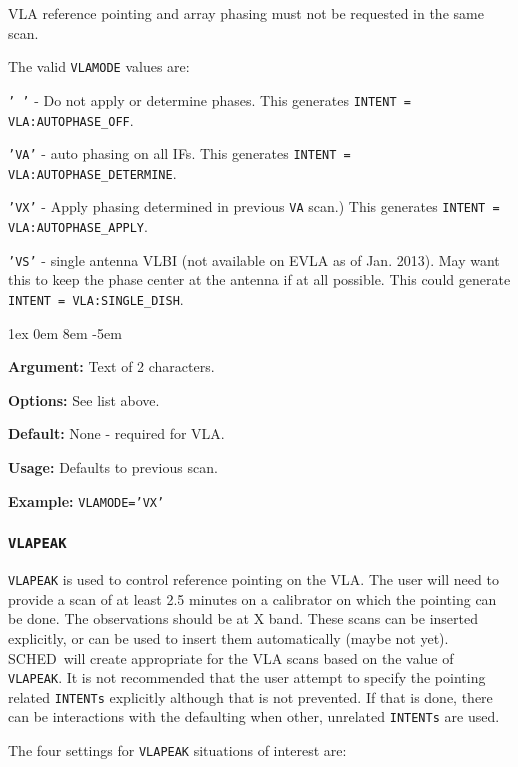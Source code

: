 \documentclass{report}
\newcommand{\schedb}{{\sc SCHED~}}
\newcommand{\rcwbox}[5]{
  \begin{list}{}{\parsep 1ex  \itemsep 0em
                 \leftmargin 8em  \itemindent -5em }
    \item {\bf Argument:} #1
    \item {\bf Options:}  #2
    \item {\bf Default:}  #3
    \item {\bf Usage:}    #4
    \item {\bf Example:}  #5
  \end{list}
}
\begin{document}
VLA reference pointing and array phasing must not be requested in the 
same scan.

The valid {\tt VLAMODE} values are:

\begin{description}

\item  {\tt '  '} - Do not apply or determine phases.
This generates {\tt INTENT = VLA:AUTOPHASE\_OFF}.

\item  {\tt 'VA'} - auto phasing on all IFs.
This generates {\tt INTENT = VLA:AUTOPHASE\_DETERMINE}.

\item  {\tt 'VX'} - Apply phasing determined in previous {\tt VA} scan.)
This generates {\tt INTENT = VLA:AUTOPHASE\_APPLY}.

\item  {\tt 'VS'} - single antenna VLBI (not available on EVLA as of Jan. 2013).
May want this to keep the phase center at the antenna if at all possible.
This could generate {\tt INTENT = VLA:SINGLE\_DISH}.


\end{description}

\rcwbox
{Text of 2 characters.}
{See list above.}
{None - required for VLA.}
{Defaults to previous scan.}
{{\tt VLAMODE='VX'}}

\subsubsection{\label{MP:VLAPEAK}{\tt VLAPEAK}}

{\tt VLAPEAK} is used to control reference pointing on the VLA.  The
user will need to provide a scan of at least 2.5 minutes on a
calibrator on which the pointing can be done.  The observations should
be at X band.  These scans can be inserted explicitly, or
 can be used to insert them
automatically (maybe not yet).  \schedb will create appropriate
 for the VLA scans based on the
value of {\tt VLAPEAK}.  It is not recommended that the user attempt
to specify the pointing related {\tt INTENTs} explicitly although that
is not prevented.  If that is done, there can be interactions with the
defaulting when other, unrelated {\tt INTENTs} are used.

The four settings for {\tt VLAPEAK} situations of interest are:
\end{document}
